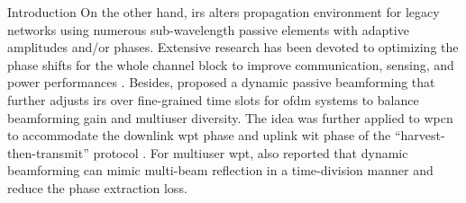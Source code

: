 \documentclass[journal]{IEEEtran}
\begin{document}
\begin{section}{Introduction}
	On the other hand, \gls{irs} alters propagation environment for legacy networks using numerous sub-wavelength passive elements with adaptive amplitudes and/or phases.
	Extensive research has been devoted to optimizing the phase shifts for the whole channel block to improve communication, sensing, and power performances \cite{Wu2018,Zhang2019a,Lin2022,Liu2022,Feng2022,Zhao2022}.
	Besides, \cite{Yang2020} proposed a dynamic passive beamforming that further adjusts \gls{irs} over fine-grained time slots for \gls{ofdm} systems to balance beamforming gain and multiuser diversity.
	The idea was further applied to \gls{wpcn} to accommodate the downlink \gls{wpt} phase and uplink \gls{wit} phase of the ``harvest-then-transmit'' protocol \cite{Wu2021d,Hua2022a}.
	For multiuser \gls{wpt}, \cite{Qiu2022} also reported that dynamic beamforming can mimic multi-beam reflection in a time-division manner and reduce the phase extraction loss.

\end{section}
\end{document}
